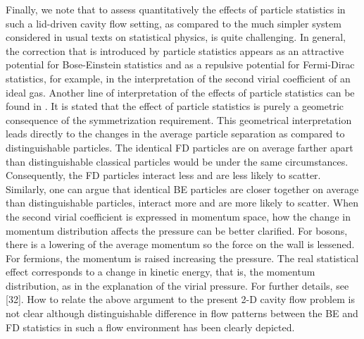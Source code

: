 \documentclass[doublecol]{epl2}
\begin{document}
Finally, we note that to assess quantitatively the effects of particle statistics in such a lid-driven cavity flow setting, as compared to the much simpler system considered in usual texts on statistical physics, is quite challenging. In general, the correction that is introduced by particle statistics appears as an attractive potential for Bose-Einstein statistics and as a repulsive potential for Fermi-Dirac statistics, for example, in the interpretation of the second virial coefficient of an ideal gas. Another line of interpretation of the effects of particle statistics can be found in \cite{Mullin2003}.
It is stated that the effect of particle statistics is purely a geometric consequence of the symmetrization requirement. This geometrical interpretation leads directly to the changes in the average particle separation as compared to distinguishable particles. The identical FD particles are on average farther apart than distinguishable classical particles would be under the same circumstances. Consequently, the FD particles interact less and are less likely to scatter. Similarly, one can argue that identical BE particles are closer together on average than distinguishable particles, interact more and are more likely to scatter. When the second virial coefficient is expressed in momentum space, how the change in momentum distribution affects the pressure can be better clarified. For bosons, there is a lowering of the average momentum so the force on the wall is lessened.  For fermions, the momentum is raised increasing the pressure. The real statistical effect corresponds to a change in kinetic energy, that is, the momentum distribution, as in the explanation of the virial pressure. For further details, see [32]. How to relate the above argument to the present 2-D cavity flow problem is not clear although distinguishable difference in flow patterns between the BE and FD statistics in such a flow environment has been clearly depicted.
\end{document}
